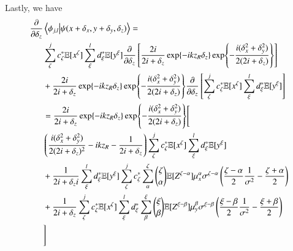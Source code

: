 \documentclass[reprint,amsmath,amssymb,aps,pra,floatfix]{revtex4-2}
\begin{document}
Lastly, we have
\begin{align}
    \frac{\partial}{\partial \delta_z} &\braket{\phi_{j,l}}{\psi(x+\delta_x,y+\delta_y,\delta_z)} = \nonumber \\
    &\sum_\zeta^j c^*_\zeta \mathbb{E}[x^\zeta]\sum_\xi^l d^*_\xi \mathbb{E}[y^\xi] \frac{\partial}{\partial \delta_z} \left [ \frac{2i}{2i + \delta_z}  \exp{-ikz_R\delta_z} \exp{-\frac{i (\delta_x^2 + \delta_y^2)}{2(2i +\delta_z)}}  \right] \nonumber \\
    &+ \frac{2i}{2i + \delta_z}  \exp{-ikz_R\delta_z} \exp{-\frac{i (\delta_x^2 + \delta_y^2)}{2(2i +\delta_z)}} \frac{\partial}{\partial \delta_z} \left[ \sum_\zeta^j c^*_\zeta \mathbb{E}[x^\zeta]\sum_\xi^l d^*_\xi \mathbb{E}[y^\xi] \right] \nonumber \\
    &= \frac{2i}{2i + \delta_z}  \exp{-ikz_R\delta_z} \exp{-\frac{i (\delta_x^2 + \delta_y^2)}{2(2i +\delta_z)}} \Biggl [ \nonumber \\
    & \left(\frac{i(\delta_x^2 + \delta_y^2)}{2(2i + \delta_z)^2} - i k z_R - \frac{1}{2i + \delta_z} \right) \sum_\zeta^j c^*_\zeta \mathbb{E}[x^\zeta] \sum_\xi^l d^*_\xi \mathbb{E}[y^\xi] \nonumber \\
    & + \frac{1}{2i + \delta_zi} \sum_\xi^l d^*_\xi \mathbb{E}[y^\xi] \sum_\zeta^j c^*_\zeta \sum_\alpha^\zeta \binom{\zeta}{\alpha} \mathbb{E}[Z^{\zeta - \alpha}] \mu_x^\alpha \sigma^{\zeta-\alpha}\left ( \frac{\zeta-\alpha}{2} \frac{1}{\sigma^2} - \frac{\zeta + \alpha}{2} \right ) \nonumber \\
    & + \frac{1}{2i + \delta_z} \sum_\zeta^j c^*_\zeta \mathbb{E}[x^\zeta] \sum_\xi^l d^*_\xi \sum_\beta^\xi \binom{\xi}{\beta} \mathbb{E}[Z^{\xi - \beta}] \mu_y^\beta \sigma^{\xi-\beta}\left ( \frac{\xi-\beta}{2} \frac{1}{\sigma^2} - \frac{\xi + \beta}{2} \right ) \nonumber \\
    & \Biggr ]
\end{align}

\twocolumngrid
\nocite{*}
\end{document}
